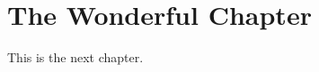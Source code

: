 %
%
%
% 
%

\chapter{The Wonderful Chapter}
\label{TheWonderfulChapter}

\indent This is the next chapter.

